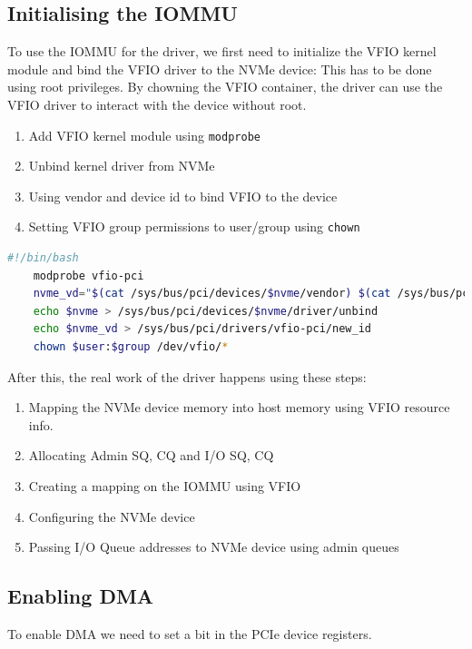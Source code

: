 \subsection{Initialising the IOMMU}

To use the IOMMU for the driver, we first need to initialize the VFIO kernel module and bind the VFIO driver to the NVMe device:
This has to be done using root privileges. By chowning the VFIO container, the driver can use the VFIO driver to interact with the device without root.

\begin{enumerate}
    \item Add VFIO kernel module using \texttt{modprobe}
    \item Unbind kernel driver from NVMe
    \item Using vendor and device id to bind VFIO to the device
    \item Setting VFIO group permissions to user/group using \texttt{chown}
\end{enumerate}

\begin{lstlisting}[language=bash,caption={Initializing VFIO using bash}]
    #!/bin/bash
    modprobe vfio-pci
    nvme_vd="$(cat /sys/bus/pci/devices/$nvme/vendor) $(cat /sys/bus/pci/devices/$nvme/device)"
    echo $nvme > /sys/bus/pci/devices/$nvme/driver/unbind
    echo $nvme_vd > /sys/bus/pci/drivers/vfio-pci/new_id
    chown $user:$group /dev/vfio/*     
\end{lstlisting}

After this, the real work of the driver happens using these steps:

\begin{enumerate}
    \item Mapping the NVMe device memory into host memory using VFIO resource info.
    \item Allocating Admin SQ, CQ and I/O SQ, CQ
    \item Creating a mapping on the IOMMU using VFIO
    \item Configuring the NVMe device
    \item Passing I/O Queue addresses to NVMe device using admin queues
\end{enumerate}

\subsection{Enabling DMA}
To enable DMA we need to set a bit in the PCIe device registers.

